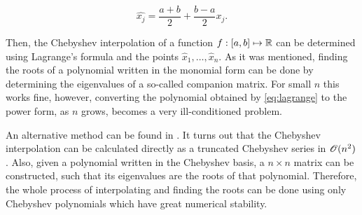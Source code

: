 \begin{equation}
\hat{x_j} = \frac{a+b}{2} + \frac{b-a}{2}x_j.
\end{equation}

Then, the Chebyshev interpolation of a function $f: [a, b] \mapsto \mathbb{R}$ can be determined using Lagrange's formula and the points $\hat{x}_1, \dots, \hat{x}_n$. 
As it was mentioned, finding the roots of a polynomial written in the monomial form can be done by determining the eigenvalues of a so-called companion matrix. For small $n$ this works fine, however, converting the polynomial obtained by \autoref{eq:lagrange} to the power form, as $n$ grows, becomes a very ill-conditioned problem. 

An alternative method can be found in . It turns out that the Chebyshev interpolation can be calculated directly as a truncated Chebyshev series in $\mathscr{O}(n^2)$. Also, given a polynomial written in the Chebyshev basis, a $n\times n$ matrix can be constructed, such that its eigenvalues are the roots of that polynomial. Therefore, the whole process of interpolating and finding the roots can be done using only Chebyshev polynomials which have great numerical stability.